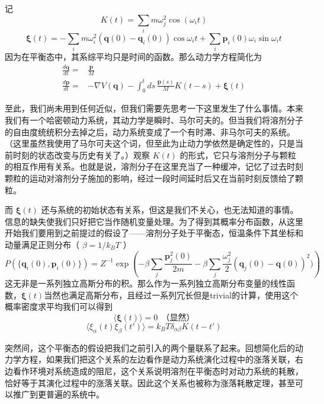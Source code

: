 \documentclass{ctexart}
\begin{document}
记
\begin{equation}
K(t)=\sum_im\omega_j^2\cos(\omega_it)
\end{equation}
\begin{equation}
\bm{\xi}(t)=-\sum_im\omega_i^2(\bm{q}(0)-\bm{q}_i(0))\cos\omega_it+\sum_i\bm{p}_i(0)\omega_i\sin\omega_i t 
\end{equation}
因为在平衡态中，其系综平均只是时间的函数。那么动力学方程简化为
\begin{align} 
\frac{d\bm{q}}{dt}=&\frac{\bm{p}}{M}\\ 
\frac{d\bm{p}}{dt}=&-\nabla V(\bm{q})-\int_0^t ds\, \frac{\bm{p}(s)}{M}K(t-s)+\bm{\xi}(t) \label{eqn_dynamics}
\end{align}

至此，我们尚未用到任何近似，但我们需要先思考一下这里发生了什么事情。本来我们有一个哈密顿动力系统，其动力学是瞬时、马尔可夫的。但当我们将溶剂分子的自由度统统积分去掉之后，动力系统变成了一个有时滞、非马尔可夫的系统。（这里虽然我使用了马尔可夫这个词，但至此为止动力学依然是确定性的，只是当前时刻的状态改变与历史有关了。）观察 $K(t)$ 的形式，它只与溶剂分子与颗粒的相互作用有关系。也就是说，溶剂分子在这里充当了一种缓冲，记忆了过去时刻颗粒的运动对溶剂分子施加的影响，经过一段时间延时后又在当前时刻反馈给了颗粒。

而 $\bm{\xi}(t)$ 还与系统的初始状态有关系，但这是我们不关心，也无法知道的事情。信息的缺失使我们只好把它当作随机变量处理。为了得到其概率分布函数，从这里开始我们要用到之前提过的假设了——溶剂分子处于平衡态，恒温条件下其坐标和动量满足正则分布（ $\beta=1/k_BT$ ）
\begin{equation}
P(\{\bm{q}_i(0),\bm{p}_i(0)\})=Z^{-1}\exp\left(-\beta\sum_j\frac{\bm{p}_j^2(0)}{2m}-\beta\sum_j\frac{\omega_j^2}{2}(\bm{q}_j(0)-\bm{q}(0))^2)\right)
\end{equation}
这无非是一系列独立高斯分布的积。那么作为一系列独立高斯分布变量的线性函数，$\bm{\xi}(t)$当然也满足高斯分布，且经过一系列冗长但是trivial的计算，使用这个概率密度求平均我们可以得到
\begin{equation}
\langle\bm{\xi}(t)\rangle=0\ \ \mbox{（显然）}
\end{equation}
\begin{equation}
\langle\xi_\alpha(t)\xi_\beta(t')\rangle=k_BT\delta_{\alpha\beta}K(t-t')
\end{equation}

突然间，这个平衡态的假设把我们之前引入的两个量联系了起来。回想简化后的动力学方程，如果我们把这个关系的左边看作是动力系统演化过程中的涨落关联，右边看作环境对系统造成的阻尼，这个关系说明溶剂在平衡态时对动力系统的耗散，恰好等于其演化过程中的涨落关联。因此这个关系也被称为涨落耗散定理，甚至可以推广到更普遍的系统中。
\end{document}

